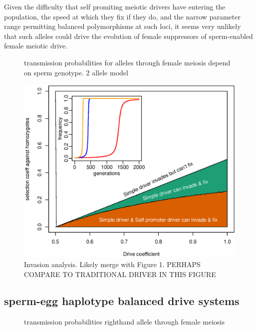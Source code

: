 \documentclass[12pt,letterpaper]{article}
\newcommand{\yb}[1]{{ \color{blue} #1}}
\begin{document}
Given the difficulty that self promiting meiotic drivers have entering the population, the speed at
which they fix if they do,
and the narrow parameter range permitting balanced polymorphisms at such loci, 
it seems very unlikely that such alleles
could drive the evolution of female suppressors of sperm-enabled
female meiotic drive.


\begin{figure}
\caption{transmission probabilities for alleles through female
  meiosis depend on sperm genotype. 2 allele model}  
\label{Eggsperm_2_allele_cartoon}
\end{figure}

\begin{figure}
\includegraphics[width = 0.8 \textwidth]{Figures/invasion_space_recessive_driver.eps}
\caption{Invasion analysis. Likely merge with Figure 1. \yb{PERHAPS COMPARE TO TRADITIONAL DRIVER IN THIS FIGURE} } \label{Invasion_space}
\end{figure}


\subsection*{ sperm-egg haplotype balanced drive systems}

\begin{figure}
\caption{transmission probabilities righthand allele through female
  meiosis}  \label{Eggsperm_3_allele_cartoon}
\end{figure}
\end{document}

